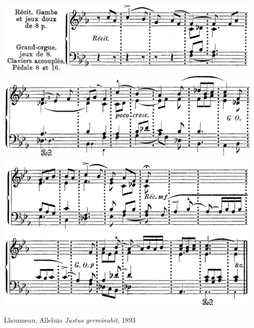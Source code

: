 \vspace*{\fill}

\clearpage

\vspace*{\fill}

\begin{example}
  \centering
  \includegraphics[width=.8\linewidth]{c/3/ex/lhoumeau_justus1.png}
  \\
  \includegraphics[width=.8\linewidth]{c/3/ex/lhoumeau_justus2.png}
  \\
  \includegraphics[width=.8\linewidth]{c/3/ex/lhoumeau_justus3.png}
  \\
  \includegraphics[width=.8\linewidth]{c/3/ex/lhoumeau_justus4.png}
  \caption{Lhoumeau, Alleluia \emph{Justus germinabit}, 1893}
  \label{mus:lhoumeau_justus}
\end{example}

\vspace*{\fill}

